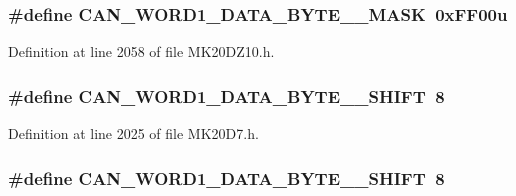 \subsubsection[{\texorpdfstring{C\+A\+N\+\_\+\+W\+O\+R\+D1\+\_\+\+D\+A\+T\+A\+\_\+\+B\+Y\+T\+E\+\_\+6\+\_\+\+M\+A\+SK}{CAN_WORD1_DATA_BYTE_6_MASK}}]{\setlength{\rightskip}{0pt plus 5cm}\#define C\+A\+N\+\_\+\+W\+O\+R\+D1\+\_\+\+D\+A\+T\+A\+\_\+\+B\+Y\+T\+E\+\_\+\_\+\+M\+A\+SK~0x\+F\+F00u}\hypertarget{group___c_a_n___register___masks_ga2a3649044e37e695317cff5b42d9c4f1}{}\label{group___c_a_n___register___masks_ga2a3649044e37e695317cff5b42d9c4f1}


Definition at line 2058 of file M\+K20\+D\+Z10.\+h.

\subsubsection[{\texorpdfstring{C\+A\+N\+\_\+\+W\+O\+R\+D1\+\_\+\+D\+A\+T\+A\+\_\+\+B\+Y\+T\+E\+\_\+6\+\_\+\+S\+H\+I\+FT}{CAN_WORD1_DATA_BYTE_6_SHIFT}}]{\setlength{\rightskip}{0pt plus 5cm}\#define C\+A\+N\+\_\+\+W\+O\+R\+D1\+\_\+\+D\+A\+T\+A\+\_\+\+B\+Y\+T\+E\+\_\+\_\+\+S\+H\+I\+FT~8}\hypertarget{group___c_a_n___register___masks_gadfb68bcd398c238b56d716fa3a8ec4ee}{}\label{group___c_a_n___register___masks_gadfb68bcd398c238b56d716fa3a8ec4ee}


Definition at line 2025 of file M\+K20\+D7.\+h.

\subsubsection[{\texorpdfstring{C\+A\+N\+\_\+\+W\+O\+R\+D1\+\_\+\+D\+A\+T\+A\+\_\+\+B\+Y\+T\+E\+\_\+6\+\_\+\+S\+H\+I\+FT}{CAN_WORD1_DATA_BYTE_6_SHIFT}}]{\setlength{\rightskip}{0pt plus 5cm}\#define C\+A\+N\+\_\+\+W\+O\+R\+D1\+\_\+\+D\+A\+T\+A\+\_\+\+B\+Y\+T\+E\+\_\+\_\+\+S\+H\+I\+FT~8}\hypertarget{group___c_a_n___register___masks_gadfb68bcd398c238b56d716fa3a8ec4ee}{}\label{group___c_a_n___register___masks_gadfb68bcd398c238b56d716fa3a8ec4ee}


